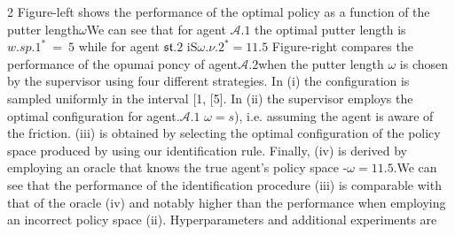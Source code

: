 \documentclass{article}
\begin{document}
\begin{paracol}{2}
Figure-left shows the performance of the optimal policy
as a function of the putter length$\omega$We can see that for agent
$\mathcal { A } . { 1 }$ the optimal putter length is $w . { s p . { 1 } } ^ { * } ~ = ~ 5$ while for agent
${ \mathfrak { s t } } . { 2 }$ iS$\omega . { \nu . { 2 } } ^ { * } = 1 1. 5$ Figure-right compares the performance
of the opumai poncy of agent${ \mathcal { A } } . { 2 }$when the putter length $\omega$
is chosen by the supervisor using four different strategies.
In (i) the configuration is sampled uniformly in the interval
[1, [5]. In (ii) the supervisor employs the optimal configuration for agent.$\mathcal { A } . { 1 }$ $\omega = s$), i.e. assuming the agent is aware
of the friction. (iii) is obtained by selecting the optimal configuration of the policy space produced by using our identification rule. Finally, (iv) is derived by employing an oracle
that knows the true agent's policy space -$\omega = 1 1. 5$.We can
see that the performance of the identification procedure (iii)
is comparable with that of the oracle (iv) and notably higher
than the performance when employing an incorrect policy
space (ii). Hyperparameters and additional experiments are

\end{paracol}
\end{document}
